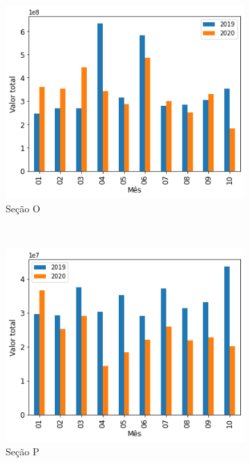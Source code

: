\begin{figure}[htb]
    \begin{subfigure}[b]{0.45\textwidth}
        \includegraphics[scale=0.45]{images/base-de-dados-17.O-comparacao-valor-total-por-secao.png}
        \caption{Seção O}
        \label{fig:pandemia:descritiva-17.O-comparacao-valor-total-por-secao}
    \end{subfigure} ~ \quad
    \begin{subfigure}[b]{0.45\textwidth}
        \includegraphics[scale=0.45]{images/base-de-dados-17.P-comparacao-valor-total-por-secao.png}
        \caption{Seção P}
        \label{fig:pandemia:descritiva-17.P-comparacao-valor-total-por-secao}
    \end{subfigure} ~ \\
    \begin{subfigure}[b]{0.45\textwidth} 

\end{subfigure}
\end{figure}
